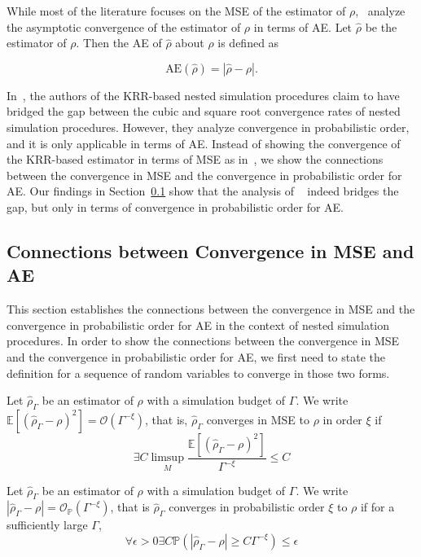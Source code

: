 While most of the literature focuses on the MSE of the estimator of $\rho$,~\cite{wang2022smooth} analyze the asymptotic convergence of the estimator of $\rho$ in terms of AE.
Let $\hat{\rho}$ be the estimator of $\rho$. 
Then the AE of $\hat{\rho}$ about $\rho$ is defined as

$$
\mbox{AE}\left(\hat{\rho}\right) = \left| \hat{\rho} - \rho \right|.
$$

In~\cite{wang2022smooth}, the authors of the KRR-based nested simulation procedures claim to have bridged the gap between the cubic and square root convergence rates of nested simulation procedures. However, they analyze convergence in probabilistic order, and it is only applicable in terms of AE. 
Instead of showing the convergence of the KRR-based estimator in terms of MSE as in~\cite{gordy2010nested}, we show the connections between the convergence in MSE and the convergence in probabilistic order for AE.
Our findings in Section~\ref{sec1:connection-mse-absolute-error} show that the analysis of ~\cite{wang2022smooth} indeed bridges the gap, but only in terms of convergence in probabilistic order for AE.

\subsection{Connections between Convergence in MSE and AE} \label{sec1:connection-mse-absolute-error}

This section establishes the connections between the convergence in MSE and the convergence in probabilistic order for AE in the context of nested simulation procedures.
In order to show the connections between the convergence in MSE and the convergence in probabilistic order for AE, we first need to state the definition for a sequence of random variables to converge in those two forms.

\begin{definition}
    Let $\hat{\rho}_{\Gamma}$ be an estimator of $\rho$ with a simulation budget of $\Gamma$. 
    We write $\mathbb{E} \left[ \left(\hat{\rho}_{\Gamma} - \rho\right)^2 \right] = \mathcal{O} \left( \Gamma^{-\xi} \right)$, that is, $\hat{\rho}_{\Gamma}$ converges in MSE to $\rho$ in order $\xi$ if 
    $$
        \exists C \limsup_{M} \frac{\mathbb{E} \left[\left(\hat{\rho}_{\Gamma} - \rho\right)^2 \right]}{\Gamma^{-\xi}} \leq C
    $$
\end{definition}

\begin{definition}
    Let $\hat{\rho}_{\Gamma}$ be an estimator of $\rho$ with a simulation budget of $\Gamma$. 
    We write $|\hat{\rho}_{\Gamma} - \rho| = \mathcal{O}_{\mathbb{P}}(\Gamma^{-\xi})$, that is $\hat{\rho}_{\Gamma}$ converges in probabilistic order $\xi$ to $\rho$ if for a sufficiently large $\Gamma$,
    $$
        \forall \epsilon > 0 \exists C \mathbb{P} \left( \left| \hat{\rho}_{\Gamma} - \rho \right| \geq C \Gamma^{-\xi} \right) \leq \epsilon 
    $$
\end{definition}

